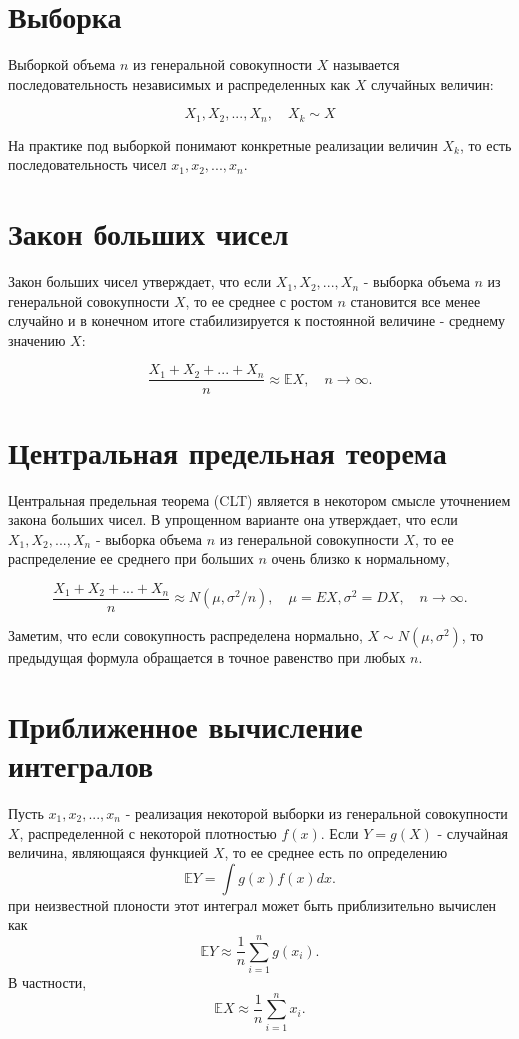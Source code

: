 \section{Выборка}

Выборкой объема $n$ из генеральной совокупности $X$ называется последовательность независимых и распределенных как $X$ случайных величин: 

$$
X_1, X_2, ..., X_n, \quad X_k \sim X
$$

На практике под выборкой понимают конкретные реализации величин $X_k$, то есть последовательность чисел $x_1, x_2, ..., x_n$.


\section{Закон больших чисел}

Закон больших чисел утверждает, что если $X_1, X_2, ..., X_n$ - выборка объема $n$ из генеральной совокупности $X$, то ее среднее с ростом $n$ становится все менее случайно и в конечном итоге стабилизируется к постоянной величине - среднему значению $X$:

$$
\frac{X_1+X_2+...+X_n}{n} \approx \mathbb{E}X, \quad n\rightarrow\infty.
$$ 


\section{Центральная предельная теорема}

Центральная предельная теорема (CLT) является в некотором смысле уточнением закона больших чисел.
В упрощенном варианте она утверждает, что если $X_1, X_2, ..., X_n$ - выборка объема $n$ из генеральной совокупности $X$, то ее распределение ее среднего при больших $n$ очень близко к нормальному,  

$$
\frac{X_1+X_2+...+X_n}{n} \approx N(\mu, \sigma^2/n), \quad \mu=EX, \sigma^2=DX, \quad n\rightarrow\infty.
$$

Заметим, что если совокупность распределена нормально, $X \sim N(\mu, \sigma^2)$, то предыдущая формула обращается в 
точное равенство при любых $n$.


\section{Приближенное вычисление интегралов}

Пусть $x_1, x_2, ..., x_n$ - реализация некоторой выборки из генеральной совокупности $X$, распределенной с некоторой плотностью $f(x)$. Если $Y = g(X)$ - случайная величина, являющаяся функцией $X$, то ее среднее есть по определению
$$
\mathbb{E}Y = \int g(x)f(x)dx.
$$
при неизвестной плоности этот интеграл может быть приблизительно вычислен как
$$
\mathbb{E}Y \approx \frac{1}{n}\sum_{i=1}^ng(x_i).
$$
В частности,
$$
\mathbb{E}X \approx \frac{1}{n}\sum_{i=1}^nx_i.
$$



